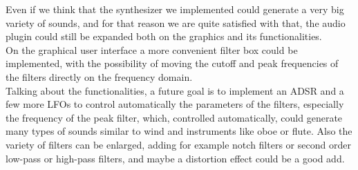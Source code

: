 \documentclass{article}
\begin{document}
Even if we think that the synthesizer we implemented could generate a very big variety of sounds, and for that reason we are quite satisfied with that, the audio plugin could still be expanded both on the graphics and its functionalities.
\\On the graphical user interface a more convenient filter box could be implemented, with the possibility of moving the cutoff and peak frequencies of the filters directly on the frequency domain.
\\Talking about the functionalities, a future goal is to implement an ADSR and a few more LFOs to control automatically the parameters of the filters, especially the frequency of the peak filter, which, controlled automatically, could generate many types of sounds similar to wind and instruments like oboe or flute. Also the variety of filters can be enlarged, adding for example notch filters or second order low-pass or high-pass filters, and maybe a distortion effect could be a good add. 
\end{document}
